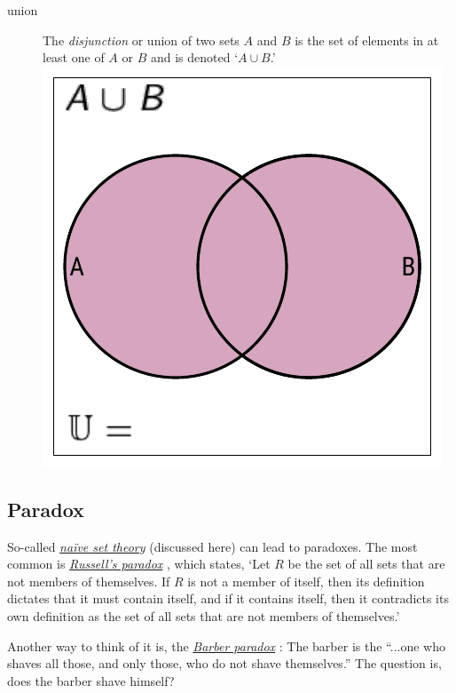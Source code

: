 \documentclass[11pt]{article}%
\begin{document}
\begin{multicols}{2}
\begin{description}
\item[union] The \textit{disjunction} or union of two sets $A$ and $B$ is the set of elements in at least one of $A$ or $B$ and is denoted `$A \cup B$.' \includegraphics*[scale = 0.75]{../../images/venn-2-or.pdf}

\end{description}

\subsection{Paradox}
\label{Paradox}

So-called \textit{\href{https://en.wikipedia.org/wiki/Naive_set_theory}{na\"ive set theory}} \parencite{wiki:naive-set-theory} (discussed here) can lead to paradoxes. The most common is \textit{\href{https://en.wikipedia.org/wiki/Russell's_paradox}{Russell's paradox}} \parencite{wiki:russells-paradox}, which states, `Let $R$ be the set of all sets that are not members of themselves. If $R$ is not a member of itself, then its definition dictates that it must contain itself, and if it contains itself, then it contradicts its own definition as the set of all sets that are not members of themselves.'

Another way to think of it is, the \textit{\href{https://en.wikipedia.org/wiki/Barber_paradox}{Barber paradox}} \parencite{wiki:barber-paradox}: The barber is the ``...one who shaves all those, and only those, who do not shave themselves.'' The question is, does the barber shave himself?


\end{multicols}
\end{document}
